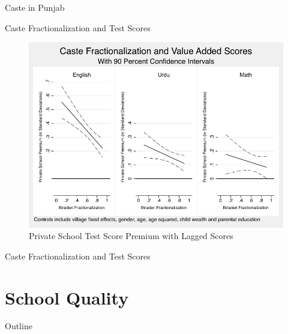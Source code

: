 \documentclass[handout]{beamer}
\begin{document}
\begin{frame}{Caste in Punjab}
\end{frame}

\begin{frame}{Caste Fractionalization and Test Scores}
	\begin{figure}[h]
		\caption{Private School Test Score Premium with Lagged Scores}\label{kidscombined}
		\centering	
		\includegraphics[scale=0.8]{graphs/kids_combined.pdf}
	\end{figure}
\end{frame}

\begin{frame}{Caste Fractionalization and Test Scores}
\end{frame}

\section{School Quality}\label{}
\begin{frame}{Outline}
	\tableofcontents[currentsection]
\end{frame}
\end{document}
